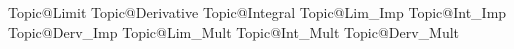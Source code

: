 Topic@Limit	         		 %
Topic@Derivative            %
Topic@Integral 				 %
Topic@Lim_Imp				 %
Topic@Int_Imp				 %
Topic@Derv_Imp				 %
Topic@Lim_Mult				 %
Topic@Int_Mult				 %
Topic@Derv_Mult				 %



